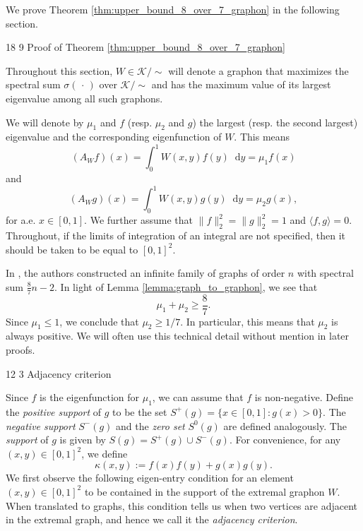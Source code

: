 \documentclass[11pt]{article}
\makeatletter
\renewcommand\section{\@startsection{section}{1}{\z@}%
{18\p@ \@plus 6\p@ \@minus 3\p@}%
{9\p@ \@plus 6\p@ \@minus 3\p@}%
{\large\bfseries\boldmath}}
\renewcommand\subsection{\@startsection{subsection}{2}{\z@}%
{12\p@ \@plus 6\p@ \@minus 3\p@}%
{3\p@ \@plus 6\p@ \@minus 3\p@}%
{\bfseries\boldmath}}
\theoremstyle{plain}
\theoremstyle{definition}
\numberwithin{equation}{section}
\newcommand{\dif}{\mathop{}\!\mathrm{d}}
\makeatother
\begin{document}
We prove Theorem \ref{thm:upper_bound_8_over_7_graphon} in the following section.

\section{Proof of Theorem \ref{thm:upper_bound_8_over_7_graphon}}
\label{sec:proof_graphon_theorem} 

Throughout this section, $W\in \mathcal{K}/\sim$ will denote a graphon that 
maximizes the spectral sum $\sigma(\,\cdot \,)$ over $\mathcal{K}/\sim$ and 
has the maximum value of its largest eigenvalue among all such graphons. 

We will denote by $\mu_1$ and $f$ (resp. $\mu_2$ and $g$) the largest (resp. the second largest) 
eigenvalue and the corresponding eigenfunction of $W$. This means 
\begin{equation}\label{eq:eigenvalue_equation_mu1_f}
(A_Wf)(x) = \int_0^1 W(x,y)f(y)\dif{y} = \mu_1f(x)
\end{equation}
and
\begin{equation}\label{eq:eigenvalue_equation_mu2_g}
(A_Wg)(x) = \int_0^1 W(x,y)g(y)\dif{y} = \mu_2g(x),     
\end{equation}
for a.e. $x\in [0,1]$. We further assume that $\|f\|_2^2 = \|g\|_2^2 = 1$ 
and $\langle f,g\rangle = 0$. Throughout, if the limits of integration of an integral 
are not specified, then it should be taken to be equal to $[0,1]^2$. 

In \cite{Ebrahimi_Mohar_Nikiforov_Ahmady_2008}, the authors constructed an infinite 
family of graphs of order $n$ with spectral sum $\frac{8}{7}n - 2$. In light of 
Lemma \ref{lemma:graph_to_graphon}, we see that 
\begin{equation}\label{eq:lower_bound}
 \mu_1 + \mu_2\ge \frac{8}{7}.  
\end{equation}
Since $\mu_1\le 1$, we conclude that $\mu_2 \geq 1/7$. In particular, this 
means that $\mu_2$ is always positive. We will often use this technical detail without mention in later proofs.

\subsection{Adjacency criterion}

Since $f$ is the eigenfunction for $\mu_1$, we can assume that $f$ is non-negative. 
Define the \emph{positive support} of $g$ to be the set $S^+(g) = \{x\in [0,1] :g(x) > 0\}$. 
The \emph{negative support} $S^-(g)$ and the \emph{zero set} $S^0(g)$ are defined analogously. 
The \emph{support} of $g$ is given by $S(g) = S^+(g)\cup S^-(g)$. For convenience, 
for any $(x,y)\in [0,1]^2$, we define 
\[
\kappa(x,y):= f(x)f(y) + g(x) g(y).
\] 
We first observe the following eigen-entry condition for an element $(x,y)\in [0,1]^2$ 
to be contained in the support of the extremal graphon $W$. When translated to graphs, 
this condition tells us when two vertices are adjacent in the extremal graph, and hence 
we call it the \emph{adjacency criterion}. 
\end{document}
